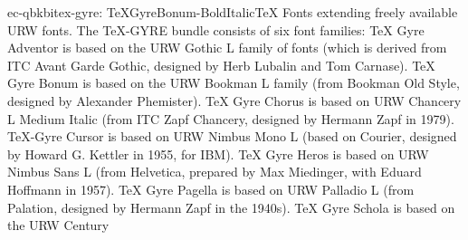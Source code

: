 \documentclass{ddltxtyp}
\begin{document}
\begin{package}{ec-qbkbi}{tex-gyre: TeXGyreBonum-BoldItalic}{{\TeX} Fonts extending freely available URW fonts.}
The {\TeX}-GYRE bundle consists of six font families: {\TeX} Gyre
Adventor is based on the URW Gothic L family of fonts (which is
derived from ITC Avant Garde Gothic, designed by Herb Lubalin
and Tom Carnase). {\TeX} Gyre Bonum is based on the URW Bookman L
family (from Bookman Old Style, designed by Alexander
Phemister). {\TeX} Gyre Chorus is based on URW Chancery L Medium
Italic (from ITC Zapf Chancery, designed by Hermann Zapf in
1979). {\TeX}-Gyre Cursor is based on URW Nimbus Mono L (based on
Courier, designed by Howard G. Kettler in 1955, for IBM). {\TeX}
Gyre Heros is based on URW Nimbus Sans L (from Helvetica,
prepared by Max Miedinger, with Eduard Hoffmann in 1957). {\TeX}
Gyre Pagella is based on URW Palladio L (from Palation,
designed by Hermann Zapf in the 1940s). {\TeX} Gyre Schola is
based on the URW Century %
\end{package}
\end{document}
